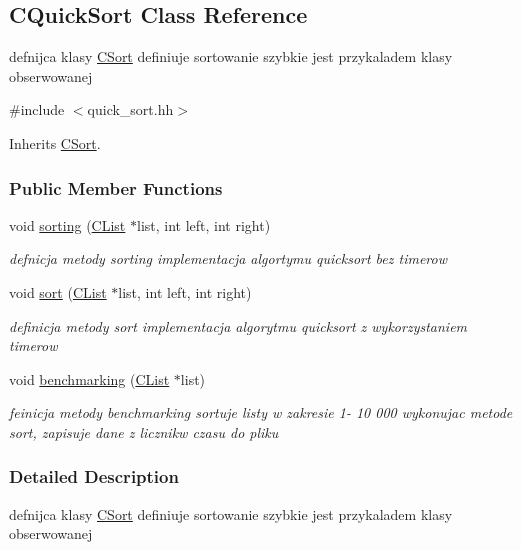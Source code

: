 \hypertarget{class_c_quick_sort}{}\subsection{C\+Quick\+Sort Class Reference}
\label{class_c_quick_sort}


defnijca klasy \hyperlink{class_c_sort}{C\+Sort} definiuje sortowanie szybkie jest przykaladem klasy obserwowanej  




{\ttfamily \#include $<$quick\+\_\+sort.\+hh$>$}



Inherits \hyperlink{class_c_sort}{C\+Sort}.

\subsubsection*{Public Member Functions}
\begin{DoxyCompactItemize}
\item 
void \hyperlink{class_c_quick_sort_a9918875ff4f1ca8430d761e5f3ac4a9c}{sorting} (\hyperlink{class_c_list}{C\+List} $\ast$list, int left, int right)
\begin{DoxyCompactList}\small\item\em defnicja metody sorting implementacja algortymu quicksort bez timerow \end{DoxyCompactList}\item 
void \hyperlink{class_c_quick_sort_a94cdaa98ea0a6ce6b1c214466f311d97}{sort} (\hyperlink{class_c_list}{C\+List} $\ast$list, int left, int right)
\begin{DoxyCompactList}\small\item\em definicja metody sort implementacja algorytmu quicksort z wykorzystaniem timerow \end{DoxyCompactList}\item 
void \hyperlink{class_c_quick_sort_ac60e09cc11c7c08dfc3ffc75d43502a7}{benchmarking} (\hyperlink{class_c_list}{C\+List} $\ast$list)
\begin{DoxyCompactList}\small\item\em feinicja metody benchmarking sortuje listy w zakresie 1-\/ 10 000 wykonujac metode sort, zapisuje dane z licznikw czasu do pliku \end{DoxyCompactList}\end{DoxyCompactItemize}


\subsubsection{Detailed Description}
defnijca klasy \hyperlink{class_c_sort}{C\+Sort} definiuje sortowanie szybkie jest przykaladem klasy obserwowanej 


